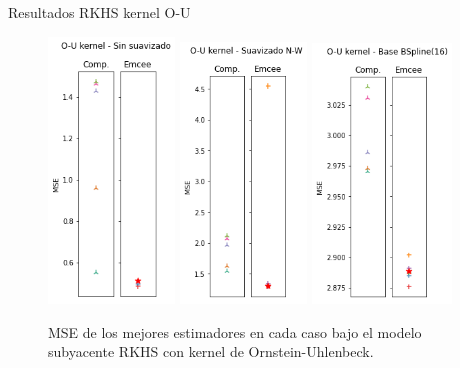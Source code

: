 \documentclass[10pt, professionalfonts]{beamer}
\begin{document}
\begin{frame}{Resultados RKHS kernel O-U}
  \begin{figure}
    \includegraphics[width=0.3\textwidth]{img/results-new/reg_rkhs_ou_none}\hfill
    \includegraphics[width=0.3\textwidth]{img/results-new/reg_rkhs_ou_nw}\hfill
    \includegraphics[width=0.33\textwidth]{img/results-new/reg_rkhs_ou_basis}
    \caption{MSE de los mejores estimadores en cada caso bajo el modelo subyacente RKHS con kernel de Ornstein-Uhlenbeck.}
  \end{figure}
\end{frame}
\end{document}
